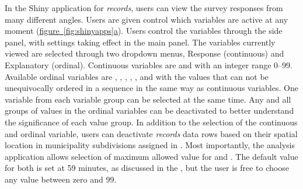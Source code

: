 In the Shiny application for \textit{records}, users can view the survey responses from many different angles. Users are given control which variables are active at any moment (\hyperref[fig:shinyapps]{figure~\ref{fig:shinyapps}a}). Users control the variables through the side panel, with settings taking effect in the main panel. The variables currently viewed are selected through two dropdown menus, Response (continuous) and Explanatory (ordinal). Continuous variables are  and  with an integer range 0--99. Available ordinal variables are , , , , , and  with the values that can not be unequivocally ordered in a sequence in the same way as continuous variables. One variable from each variable group can be selected at the same time. Any and all groups of values in the ordinal variables can be deactivated to better understand the significance of each value group. In addition to the selection of the continuous and ordinal variable, users can deactivate \textit{records} data rows based on their spatial location in municipality subdivisions assigned in \hyperref[sec:processdata]{}. Most importantly, the analysis application allows selection of maximum allowed value for  and . The default value for both is set at 59 minutes, as discussed in the , but the user is free to choose any value between zero and 99.


